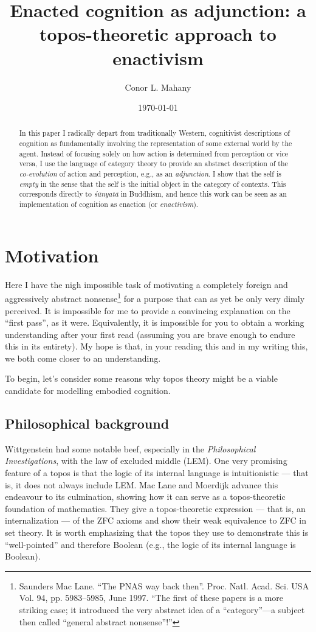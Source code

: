 \documentclass{article}
\title{Enacted cognition as adjunction: a topos-theoretic approach to enactivism}
\author{Conor L. Mahany}
\date{\today}
\begin{document}
\maketitle

\begin{abstract}
In this paper I radically depart from traditionally Western, cognitivist descriptions of cognition as fundamentally involving the representation of some external world by the agent. Instead of focusing solely on how action is determined from perception or vice versa, I use the language of category theory to provide an abstract description of the \emph{co-evolution} of action and perception, e.g., as an \emph{adjunction}. I show that the self is \emph{empty} in the sense that the self is the initial object in the category of contexts. This corresponds directly to \emph{śūnyatā} in Buddhism, and hence this work can be seen as an implementation of cognition as enaction (or \emph{enactivism}).
\end{abstract}

\tableofcontents

\section{Motivation}

Here I have the nigh impossible task of motivating a completely foreign and aggressively abstract nonsense\footnote{Saunders Mac Lane. ``The PNAS way back then''. Proc. Natl. Acad. Sci. USA Vol. 94, pp. 5983–5985, June 1997. ``The first of these papers is a more striking case; it introduced the very abstract idea of a ``category''—a subject then called ``general abstract nonsense''!''} for a purpose that can as yet be only very dimly perceived. It is impossible for me to provide a convincing explanation on the ``first pass'', as it were. Equivalently, it is impossible for you to obtain a working understanding after your first read (assuming you are brave enough to endure this in its entirety). My hope is that, in your reading this and in my writing this, we both come closer to an understanding.

To begin, let's consider some reasons why topos theory might be a viable candidate for modelling embodied cognition. 

\subsection{Philosophical background}
Wittgenstein had some notable beef, especially in the \emph{Philosophical Investigations}, with the law of excluded middle (LEM). One very promising feature of a topos is that the logic of its internal language is intuitionistic --- that is, it does not always include LEM. Mac Lane and Moerdijk advance this endeavour to its culmination, showing how it can serve as a topos-theoretic foundation of mathematics. They give a topos-theoretic expression --- that is, an internalization --- of the ZFC axioms and show their weak equivalence to ZFC in set theory. It is worth emphasizing that the topos they use to demonstrate this is ``well-pointed'' and therefore Boolean (e.g., the logic of its internal language is Boolean).
\end{document}

